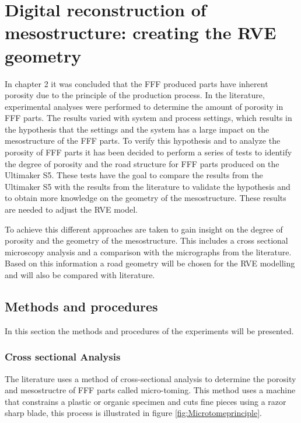 \chapter{Digital reconstruction of mesostructure: creating the RVE geometry}
\label{chp:4meso}

\graphicspath{{chapter_4/figures/}}
\graphicspath{{chapter_2/figures/}}%

In chapter 2 it was concluded that the FFF produced parts have inherent porosity due to the principle of the production process. In the literature, experimental analyses were performed to determine the amount of porosity in FFF parts. The results varied with system and process settings, which results in the hypothesis that the settings and the system has a large impact on the mesostructure of the FFF parts. To verify this hypothesis and to analyze the porosity of FFF parts it has been decided to perform a series of tests to identify the degree of porosity and the road structure for FFF parts produced on the Ultimaker S5. These tests have the goal to compare the results from the Ultimaker S5 with the results from the literature to validate the hypothesis and to obtain more knowledge on the geometry of the mesostructure. These results are needed to adjust the RVE model.

To achieve this different approaches are taken to gain insight on the degree of porosity and the geometry of the mesostructure. This includes a cross sectional microscopy analysis and a comparison with the micrographs from the literature. Based on this information a road geometry will be chosen for the RVE modelling and will also be compared with literature.  %

\section{Methods and procedures}
In this section the methods and procedures of the experiments will be presented.
\subsection{Cross sectional Analysis}
The literature uses a method of cross-sectional analysis to determine the porosity and mesostructre of FFF parts called micro-toming. This method uses a machine that constrains a plastic or organic specimen and cuts fine pieces using a razor sharp blade, this process is illustrated in figure \ref{fig:Microtomeprinciple}.

